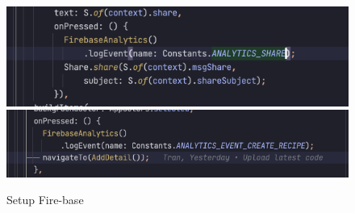 \documentclass{article}
\begin{document}
\begin{figure}[h!]
    \centering
    \includegraphics[scale=0.45]{Images/firebaselog-setup1.png}
    \includegraphics[scale=0.45]{Images/firebaselog-setup2.png}
    \caption{Setup Fire-base}
    \label{fig:cookingbook}
\end{figure}

\newpage
\end{document}
